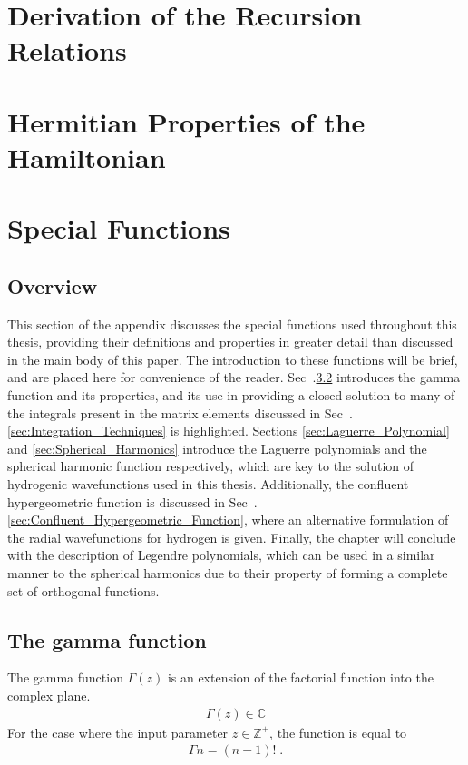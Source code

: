 \chapter{Derivation of the Recursion Relations}
\chapter{Hermitian Properties of the Hamiltonian} \label{sec:Hermitian_Left}
\chapter{Special Functions}
    \section{Overview}
        This section of the appendix discusses the special functions used throughout this thesis, providing their definitions and properties in greater detail than discussed in the main body of this paper. The introduction to these functions will be brief, and are placed here for convenience of the reader. Sec~.\ref{sec:Gamma_Function} introduces the gamma function and its properties, and its use in providing a closed solution to many of the integrals present in the matrix elements discussed in Sec~.\ref{sec:Integration_Techniques} is highlighted. Sections \ref{sec:Laguerre_Polynomial} and \ref{sec:Spherical_Harmonics} introduce the Laguerre polynomials and the spherical harmonic function respectively, which are key to the solution of hydrogenic wavefunctions used in this thesis. Additionally, the confluent hypergeometric function is discussed in Sec~.\ref{sec:Confluent_Hypergeometric_Function}, where an alternative formulation of the radial wavefunctions for hydrogen is given. Finally, the chapter will conclude with the description of Legendre polynomials, which can be used in a similar manner to the spherical harmonics due to their property of forming a complete set of orthogonal functions.
    \section{The gamma function} \label{sec:Gamma_Function}
        The gamma function $\Gamma(z)$ is an extension of the factorial function into the complex plane. 
        \begin{align}
            \Gamma(z) \in \mathbb{C} 
        \end{align}
        For the case where the input parameter $z \in \mathbb{Z}^+$, the function is equal to 
        \begin{align}
            \Gamma{n} = (n - 1)!\;.
        \end{align}

